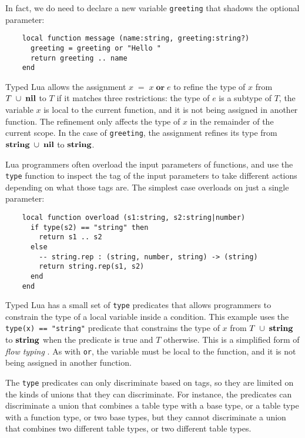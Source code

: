 In fact, we do need to declare a new variable \texttt{greeting} that
shadows the optional parameter:
\begin{verbatim}
    local function message (name:string, greeting:string?)
      greeting = greeting or "Hello "
      return greeting .. name
    end
\end{verbatim}

Typed Lua allows the assignment $x\;=\;x\;\mathbf{or}\;e$ to refine
the type of $x$ from $T\;\cup\;\mathbf{nil}$ to $T$ if it matches three restrictions: 
the type of $e$ is a subtype of $T$, the variable $x$ is local to the
current function, and it is not being assigned in another function.
The refinement only affects the type of $x$ in the remainder of the
current scope.
In the case of \texttt{greeting}, the assignment refines its type
from $\mathbf{string}\;\cup\;\mathbf{nil}$ to $\mathbf{string}$. 

Lua programmers often overload the input parameters of functions,
and use the \texttt{type} function to inspect the tag of the
input parameters to take different actions depending on what
those tags are.
The simplest case overloads on just a single parameter:
\begin{verbatim}
    local function overload (s1:string, s2:string|number)
      if type(s2) == "string" then
        return s1 .. s2
      else
        -- string.rep : (string, number, string) -> (string)
        return string.rep(s1, s2)
      end
    end
\end{verbatim}

Typed Lua has a small set of \texttt{type} predicates that allows
programmers to constrain the type of a local variable inside a condition.
This example uses the \texttt{type(x) == "string"} predicate that
constrains the type of $x$ from $T\;\cup\;\mathbf{string}$ to $\mathbf{string}$ when
the predicate is true and $T$ otherwise.
This is a simplified form of \emph{flow typing} \citep{guha2011tlc,tobin-hochstadt2010ltu}.
As with \texttt{or}, the variable must be local to the function,
and it is not being assigned in another function.

The \texttt{type} predicates can only discriminate based on tags,
so they are limited on the kinds of unions that they can discriminate.
For instance, the predicates can discriminate a union that combines
a table type with a base type, or a table type with a function type,
or two base types, but they cannot discriminate a union that combines
two different table types, or two different table types.

